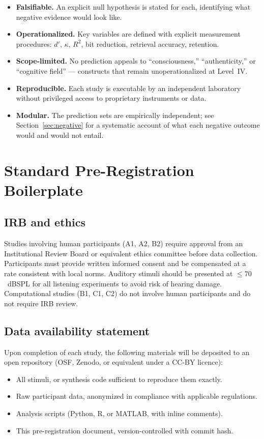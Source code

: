 \documentclass[11pt, a4paper]{article}
\begin{document}
\begin{itemize}
  \item \textbf{Falsifiable.}  An explicit null hypothesis is stated for each,
    identifying what negative evidence would look like.
  \item \textbf{Operationalized.}  Key variables are defined with explicit
    measurement procedures: $d'$, $\kappa$, $R^2$, bit reduction, retrieval
    accuracy, retention.
  \item \textbf{Scope-limited.}  No prediction appeals to ``consciousness,''
    ``authenticity,'' or ``cognitive field'' — constructs that remain
    unoperationalized at Level~IV.
  \item \textbf{Reproducible.}  Each study is executable by an independent
    laboratory without privileged access to proprietary instruments or data.
  \item \textbf{Modular.}  The prediction sets are empirically independent;
    see Section~\ref{sec:negative} for a systematic account of what each
    negative outcome would and would not entail.
\end{itemize}

\section{Standard Pre-Registration Boilerplate}

\subsection{IRB and ethics}

Studies involving human participants (A1, A2, B2) require approval from an
Institutional Review Board or equivalent ethics committee before data collection.
Participants must provide written informed consent and be compensated at a rate
consistent with local norms.  Auditory stimuli should be presented at
$\leq 70$~dBSPL for all listening experiments to avoid risk of hearing damage.
Computational studies (B1, C1, C2) do not involve human participants and do not
require IRB review.

\subsection{Data availability statement}

Upon completion of each study, the following materials will be deposited to an
open repository (OSF, Zenodo, or equivalent under a CC-BY licence):
\begin{itemize}
  \item All stimuli, or synthesis code sufficient to reproduce them exactly.
  \item Raw participant data, anonymized in compliance with applicable regulations.
  \item Analysis scripts (Python, R, or MATLAB, with inline comments).
  \item This pre-registration document, version-controlled with commit hash.
\end{itemize}
\end{document}
